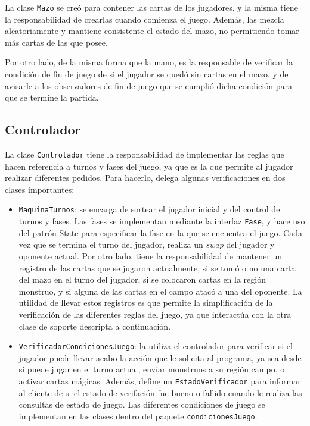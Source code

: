 	La clase \texttt{Mazo} se creó para contener las cartas de los jugadores, y la misma tiene la responsabilidad de crearlas cuando comienza el juego. Además, las mezcla aleatoriamente y mantiene consistente el estado del mazo, no permitiendo tomar más cartas de las que posee.
	
	Por otro lado, de la misma forma que la mano, es la responsable de verificar la condición de fin de juego de si el jugador se quedó sin cartas en el mazo, y de avisarle a los observadores de fin de juego que se cumplió dicha condición para que se termine la partida.
	
	\subsection{Controlador}
	
	La clase \texttt{Controlador} tiene la responsabilidad de implementar las reglas que hacen referencia a turnos y fases del juego, ya que es la que permite al jugador realizar diferentes pedidos. Para hacerlo, delega algunas verificaciones en dos clases importantes:
	\begin{itemize}
		\item \texttt{MaquinaTurnos}: se encarga de sortear el jugador inicial y del control de turnos y fases. Las fases se implementan mediante la interfaz \texttt{Fase}, y hace uso del patrón State para especificar la fase en la que se encuentra el juego. Cada vez que se termina el turno del jugador, realiza un \emph{swap} del jugador y oponente actual. Por otro lado, tiene la responsabilidad de mantener un registro de las cartas que se jugaron actualmente, si se tomó o no una carta del mazo en el turno del jugador, si se colocaron cartas en la región monstruo, y si alguna de las cartas en el campo atacó a una del oponente. La utilidad de llevar estos registros es que permite la simplificación de la verificación de las diferentes reglas del juego, ya que interactúa con la otra clase de soporte descripta a continuación.
		\item \texttt{VerificadorCondicionesJuego}: la utiliza el controlador para verificar si el jugador puede llevar acabo la acción que le solicita al programa, ya sea desde si puede jugar en el turno actual, envíar monstruos a su región campo, o activar cartas mágicas. Además, define un \texttt{EstadoVerificador} para informar al cliente de si el estado de verifación fue bueno o fallido cuando le realiza las consultas de estado de juego. Las diferentes condiciones de juego se implementan en las clases dentro del paquete \texttt{condicionesJuego}.
	\end{itemize}
	
